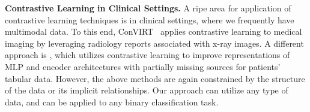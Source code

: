 \textbf{Contrastive Learning in Clinical Settings.}
A ripe area for application of contrastive learning techniques is in clinical settings, where we frequently have multimodal data.
To this end, ConVIRT~\cite{zhang_contrastive_2022} applies contrastive learning to medical imaging by leveraging radiology reports associated with x-ray images.
A different approach is \cite{xiacontrastive}, which utilizes contrastive learning to improve representations of MLP and encoder architectures with partially missing sources for patients' tabular data.
However, the above methods are again constrained by the structure of the data or its implicit relationships. Our approach can utilize any type of data, and can be applied to any binary classification task.


